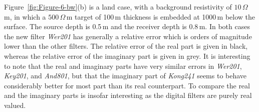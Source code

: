 \documentclass[paper,twocolumn,twoside]{geophysics}
\begin{document}
Figure~\ref{fig:Figure-6-bw}(b) is a land case, with a background resistivity
of $10\,\Omega\,$m, in which a $500\,\Omega\,$m target of 100\,m thickness is
embedded at 1000\,m below the surface. The source depth is 0.5\,m and the
receiver depth is 0.8\,m. In both cases the new filter \emph{Wer201} has
generally a relative error which is orders of magnitude lower than the other
filters. The relative error of the real part is given in black, whereas the
relative error of the imaginary part is given in grey. It is interesting to
note that the real and imaginary parts have very similar errors in
\emph{Wer201}, \emph{Key201}, and \emph{And801}, but that the imaginary part of
\emph{Kong241} seems to behave considerably better for most part than its real
counterpart. To compare the real and the imaginary parts is insofar interesting
as the digital filters are purely real valued.
\end{document}
